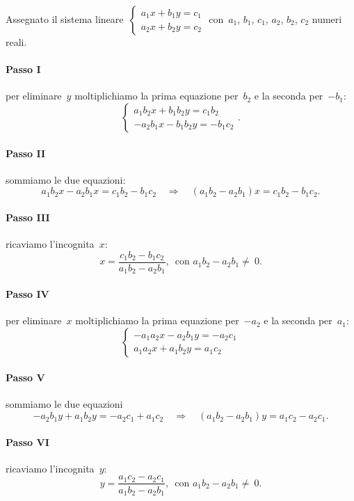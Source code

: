 Assegnato il sistema lineare~$\left\{\begin{array}{l}a_{1}x+b_{1}y=c_{1}\\a_{2}x+b_{2}y=c_{2} \end{array}\right.$
con~$a_{1}$, $b_{1}$, $c_{1}$, $a_{2}$, $b_{2}$, $c_{2}$ numeri reali.

\paragraph{Passo I} per eliminare~$y$ moltiplichiamo la prima equazione per~$b_{2}$ e la seconda per~$-b_{1}$:
\[\left\{\begin{array}{l}a_{1}b_{2}x+b_{1}b_{2}y=c_{1}b_{2}\\-a_{2}b_{1}x-b_{1}b_{2}y=-b_{1}c_{2}\end{array}\right..\]

\paragraph{Passo II} sommiamo le due equazioni:
\[a_{1}b_{2}x-a_{2}b_{1}x=c_{1}b_{2}-b_{1}c_{2}\quad\Rightarrow\quad (a_{1}b_{2}-a_{2}b_{1})x=c_{1}b_{2}-b_{1}c_{2}.\]

\paragraph{Passo III} ricaviamo l'incognita~$x$:
 \[x=\frac{c_{1}b_{2}-b_{1}c_{2}}{a_{1}b_{2}-a_{2}b_{1}}\text{,~~con }a_{1}b_{2}-a_{2}b_{1}\neq~0.\]

\paragraph{Passo IV} per eliminare~$x$ moltiplichiamo la prima equazione per~$-a_{2}$ e la seconda per~$a_{1}$:
\[\left\{\begin{array}{l}-a_{1}a_{2}x-a_{2}b_{1}y=-a_{2}c_{1}\\a_{1}a_{2}x+a_{1}b_{2}y=a_{1}c_{2}\end{array}\right.\]

\paragraph{Passo V} sommiamo le due equazioni
\[-a_{2}b_{1}y+a_{1}b_{2}y=-a_{2}c_{1}+a_{1}c_{2}\quad\Rightarrow\quad
(a_{1}b_{2}-a_{2}b_{1})y=a_{1}c_{2}-a_{2}c_{1}.\]

\paragraph{Passo VI} ricaviamo l'incognita~$y$:
\[y=\frac{a_{1}c_{2}-a_{2}c_{1}}{a_{1}b_{2}-a_{2}b_{1}}\text{,~~con }a_{1}b_{2}-a_{2}b_{1}\neq~0.\]

